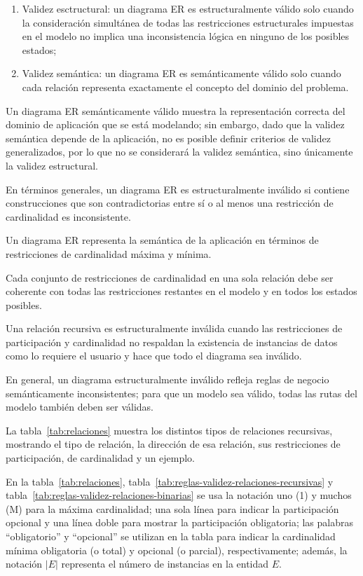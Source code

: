 \begin{enumerate}
    \item Validez esctructural: un diagrama ER es estructuralmente válido solo cuando la consideración simultánea de todas las restricciones estructurales impuestas en el modelo no implica una inconsistencia lógica en ninguno de los posibles estados; 
    \item Validez semántica: un diagrama ER es semánticamente válido solo cuando cada relación representa exactamente el concepto del dominio del problema. 
\end{enumerate}


 Un diagrama ER semánticamente válido muestra la representación correcta del dominio de aplicación que se está modelando; sin embargo, dado que la validez semántica depende de la aplicación, no es posible definir criterios de validez generalizados, por lo que no se considerará la validez semántica, sino únicamente la validez estructural.


En términos generales, un diagrama ER es estructuralmente inválido si contiene construcciones que son contradictorias entre sí o al menos una restricción de cardinalidad es inconsistente.


Un diagrama ER representa la semántica de la aplicación en términos de restricciones de cardinalidad máxima y mínima. 


Cada conjunto de restricciones de cardinalidad en una sola relación debe ser coherente con todas las restricciones restantes en el modelo y en todos los estados posibles.


Una relación recursiva es estructuralmente inválida cuando las restricciones de participación y cardinalidad no respaldan la existencia de instancias de datos como lo requiere el usuario y hace que todo el diagrama sea inválido.


En general, un diagrama estructuralmente inválido refleja reglas de negocio semánticamente inconsistentes; para que un modelo sea válido, todas las rutas del modelo también deben ser válidas.


La tabla~\ref{tab:relaciones} muestra los distintos tipos de relaciones recursivas, mostrando el tipo de relación, la dirección de esa relación, sus restricciones de participación, de cardinalidad y un ejemplo.


En la tabla~\ref{tab:relaciones}, tabla~\ref{tab:reglas-validez-relaciones-recursivas} y tabla~\ref{tab:reglas-validez-relaciones-binarias} se usa la notación uno (1) y muchos (M) para la máxima cardinalidad; una sola línea para indicar la participación opcional y una línea doble para mostrar la participación obligatoria; las palabras ``obligatorio'' y ``opcional'' se utilizan en la tabla para indicar la cardinalidad mínima obligatoria (o total) y opcional (o parcial), respectivamente; además, la notación $|E|$ representa el número de instancias en la entidad $E$.


